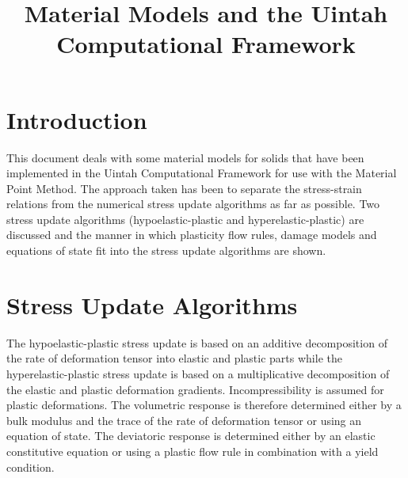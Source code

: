 
\title{Material Models and the Uintah Computational Framework}


\maketitle
\tableofcontents

\section{Introduction}
This document deals with some material models for solids that
have been implemented in the Uintah Computational Framework 
for use with the Material Point Method.  The approach taken
has been to separate the stress-strain relations from the 
numerical stress update algorithms as far as possible.  Two
stress update algorithms (hypoelastic-plastic and 
hyperelastic-plastic) are discussed and the manner in which 
plasticity flow rules, damage models and equations of state
fit into the stress update algorithms are shown.
  
\section{Stress Update Algorithms}
The hypoelastic-plastic stress update is based on an additive
decomposition of the rate of deformation tensor into elastic
and plastic parts while the hyperelastic-plastic stress update
is based on a multiplicative decomposition of the elastic and 
plastic deformation gradients.  Incompressibility is assumed
for plastic deformations.  The volumetric response is therefore
determined either by a bulk modulus and the trace of the rate
of deformation tensor or using an equation of state.  The 
deviatoric response is determined either by an elastic constitutive 
equation or using a plastic flow rule in combination with a 
yield condition. 
  
